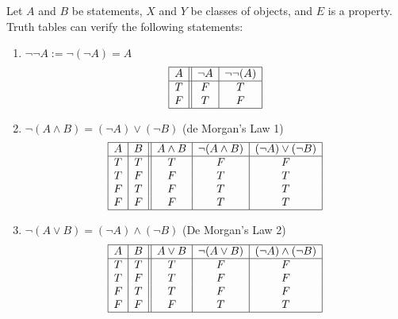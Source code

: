 \begin{example}\label{ex:1.1} Let $A$ and $B$ be statements, $X$ and $Y$ be classes of objects, and $E$ is a property. Truth tables can verify the following statements:

    \begin{enumerate}[label=(\alph*)]
        \item $\neg\neg A := \neg(\neg A) = A$
            $$
            \begin{array}{|c||c|c|}
                \hline
                A & \neg A & \neg\neg(A) \\
                \hline
                T & F & T \\
                F & T & F \\
                \hline
            \end{array}
            $$
        \item $\neg(A \land B) = (\neg A) \lor (\neg B)$ (de Morgan's Law 1)
            $$
            \begin{array}{|c|c||c|c|c|}
                \hline
                A & B & A \land B & \neg (A \land B) & (\neg A) \lor (\neg B) \\
                \hline
                T & T & T         & F                & F \\
                T & F & F         & T                & T \\
                F & T & F         & T                & T \\
                F & F & F         & T                & T \\
                \hline
            \end{array}
            $$
        \item \label{ex:1.1(c)} $\neg(A \lor B) = (\neg A) \land (\neg B)$ (De Morgan's Law 2)
            $$
            \begin{array}{|c|c||c|c|c|}
                \hline
                A & B & A \lor B & \neg (A \lor B) & (\neg A) \land(\neg B) \\
                \hline
                T & T & T         & F                & F \\
                T & F & T         & F                & F \\
                F & T & T         & F                & F \\
                F & F & F         & T                & T \\
                \hline
            \end{array}
$$
\end{enumerate}
\end{example}

